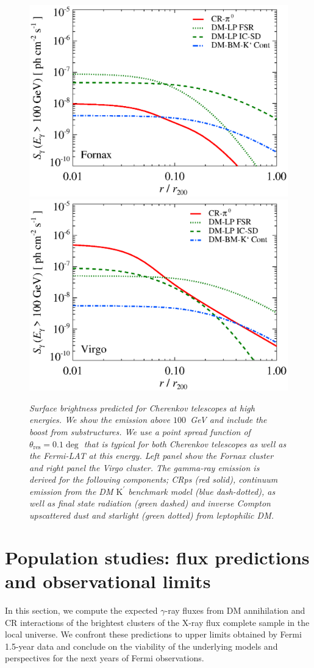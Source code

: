 \documentclass[10pt,aps,pra,reprint,amsmath,amsfonts,amssymb,showpacs]{revtex4-1}
\newcommand{\rmn}{\mathrm}
\newcommand{\psf}{\theta_\rmn{res}}
\newcommand{\Kp}{\rmn{K}^\prime}
\begin{document}
\begin{figure}
\begin{minipage}{2.0\columnwidth}
  \includegraphics[width=0.49\columnwidth]{figures/SB.Fornax.v11.SF300.SubMass.elmu.eps}
  \includegraphics[width=0.49\columnwidth]{figures/SB.Virgo.v11.SF300.SubMass.elmu.eps}
\caption{\it Surface brightness predicted for Cherenkov telescopes at
  high energies. We show the emission above $100$~GeV and include the
  boost from substructures. We use a point spread function of
  $\psf=0.1\deg$ that is typical for both Cherenkov
  telescopes as well as the Fermi-LAT at this energy. Left panel show
  the Fornax cluster and right panel the Virgo cluster. The gamma-ray
  emission is derived for the following components; CRps (red solid),
  continuum emission from the DM $\Kp$ benchmark model (blue
  dash-dotted), as well as final state radiation (green dashed) and
  inverse Compton upscattered dust and starlight (green dotted) from
  leptophilic DM.}
 \label{fig:SB_IACTs}
\end{minipage}
\end{figure}



\section{Population studies: flux predictions and observational limits}


In this section, we compute the expected $\gamma$-ray fluxes from DM
annihilation and CR interactions of the brightest clusters of the X-ray flux
complete sample in the local universe. We confront these predictions to upper
limits obtained by Fermi 1.5-year data and conclude on the viability of the
underlying models and perspectives for the next years of Fermi observations.
\end{document}
